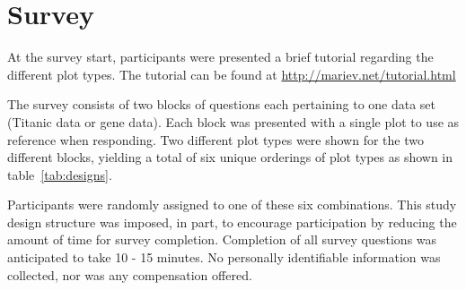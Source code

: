
%


\appendices
\section{Survey }\label{app2}

At the survey start, participants were presented a brief tutorial regarding the different plot types. The tutorial can be found at \url{http://mariev.net/tutorial.html}

The survey consists of two blocks of questions each pertaining to one data set (Titanic data or gene data). Each block was presented with a single plot  to use as reference when responding. Two different plot types were shown for the two different blocks, yielding a total of six unique orderings of plot types as shown in table~\ref{tab:designs}.

Participants were randomly assigned to one of these six combinations.  This study design structure was imposed, in part,  to encourage participation by reducing the amount of time for survey completion. Completion of all survey questions was anticipated to take 10 - 15 minutes.
No personally identifiable information was collected, nor was any compensation offered.   

